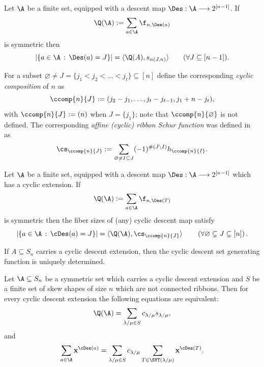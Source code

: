 \begin{theorem} \label{thm:fiber-Des}
    Let  $\A$ be a finite set, equipped with a descent map
    $\Des: \A \longrightarrow 2^{[n-1]}$. 
    If 
    \[
        \Q(\A) :=
        \sum_{a\in \A} \f_{n,\Des(a)}
    \]
    is symmetric then
    \[
        |\{a \in \A \,:\, \Des(a)=J\}| = \langle \Q(A), s_{\alpha(J,n)} \rangle
        \qquad (\forall J\subseteq [n-1]).
    \]
\end{theorem}

For a subset $\varnothing \ne J = \{ j_1 < j_2 < \ldots < j_t \}
\subseteq [n]$
define the corresponding {\em cyclic composition} of $n$  as
\[
    \ccomp{n}{J} := 
    (j_2-j_1, \ldots, j_t - j_{t-1}, j_1 + n - j_t),
\]
with $\ccomp{n}{J} := (n)$ when $J = \{j_1\}$;
note that $\ccomp{n}{\varnothing}$ is not defined.
The corresponding {\em affine (cyclic) ribbon Schur function} was defined in~\cite{ARR} as
\[
    \cs_{\ccomp{n}{J}} := 
    \sum_{\varnothing \neq I \subseteq J}
    (-1)^{\#(J \setminus I)} h_{\ccomp{n}{I}}.
\]

\begin{theorem}\label{thm:fiber-cDes}
    Let $\A$ be a finite set, equipped with a descent map
    $\Des: \A \longrightarrow 2^{[n-1]}$ 
    which has a cyclic  extension. If
    \[
        \Q(\A):=\sum\limits_{a\in \A} \f_{n,\Des(T)}
    \]
    is symmetric then the fiber sizes of (any) cyclic descent map satisfy
    \[
        |\{a \in \A \,:\, \cDes(a) =J\}|
        = \langle \Q(\A), \cs_{\ccomp{n}{J}} \rangle
        \qquad \left( \forall \varnothing \subsetneq J \subsetneq [n] \right).
    \]
\end{theorem}

\begin{proposition} If $A\subseteq S_n$ carries a cyclic descent extension, then 
the cyclic descent set generating function is uniquely determined.
\end{proposition}

\begin{corollary}\label{cor:cDes-dist-Schur}
    Let $\A\subseteq S_n$ be a symmetric set which carries a cyclic descent extension 
    and $S$ be a finite set of skew shapes of size $n$ which are not connected ribbons. Then 
    for every cyclic descent extension 
    the following equations are equivalent:
    \begin{equation}\label{eq:dist1}
        \Q(\A) = \sum\limits_{\lambda/\mu\in S} c_{\lambda/\mu} s_{\lambda/\mu},
    \end{equation}
    and
    \begin{equation}\label{eq:dist2}
        \sum\limits_{a\in \A} {\bf x}^{\cDes(a)} = \sum\limits_{\lambda/\mu\in S} c_{\lambda/\mu} 
        \sum\limits_{T\in \SYT(\lambda/\mu)} {\bf x}^{\cDes(T)}.
    \end{equation}
\end{corollary}

